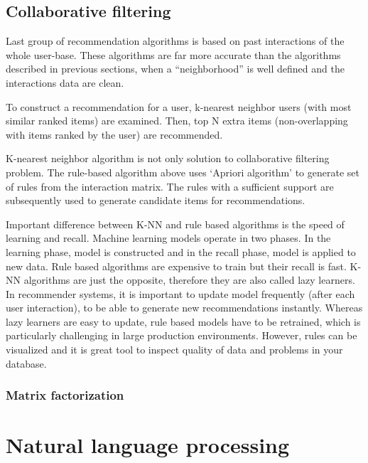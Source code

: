 \documentclass{book}
\begin{document}
\section{Collaborative filtering}
Last group of recommendation algorithms is based on past interactions of the whole user-base. These algorithms are far more accurate than the algorithms described in previous sections, when a ``neighborhood'' is well defined and the interactions data are clean.

To construct a recommendation for a user, k-nearest neighbor users (with most similar ranked items) are examined. Then, top N extra items (non-overlapping with items ranked by the user) are recommended.

K-nearest neighbor algorithm is not only solution to collaborative filtering problem. The rule-based algorithm above uses `Apriori algorithm' to generate set of rules from the interaction matrix. The rules with a sufficient support are subsequently used to generate candidate items for recommendations.

Important difference between K-NN and rule based algorithms is the speed of learning and recall. Machine learning models operate in two phases. In the learning phase, model is constructed and in the recall phase, model is applied to new data. Rule based algorithms are expensive to train but their recall is fast. K-NN algorithms are just the opposite, therefore they are also called lazy learners. In recommender systems, it is important to update model frequently (after each user interaction), to be able to generate new recommendations instantly. Whereas lazy learners are easy to update, rule based models have to be retrained, which is particularly challenging in large production environments. However, rules can be visualized and it is great tool to inspect quality of data and problems in your database. 

\subsection{Matrix factorization}

\chapter{Natural language processing}
\end{document}
